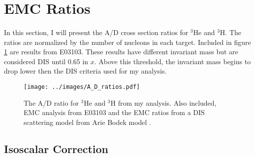\section{EMC Ratios}
\paragraph{}In this section, I will present the A/D cross section ratios for $^3$He and $^3$H. The ratios are normalized by the number of nucleons in each target. Included in figure \ref{ADplot} are results from E03103. These results have different invariant mass but are considered DIS until 0.65 in $x$. Above this threshold, the invariant mass begins to drop lower then the DIS criteria used for my analysis. 
\begin{figure}
	\centering
	\texttt{[image: ../images/A\_D\_ratios.pdf]}
	\caption{The A/D ratio for $^3$He and $^3$H from my analysis. Also included, EMC analysis from E03103\cite{seeley} and the EMC ratios from a DIS scattering model from Arie Bodek model \cite{DISmodel}.}
	\label{ADplot}
\end{figure}


\subsection{Isoscalar Correction}
